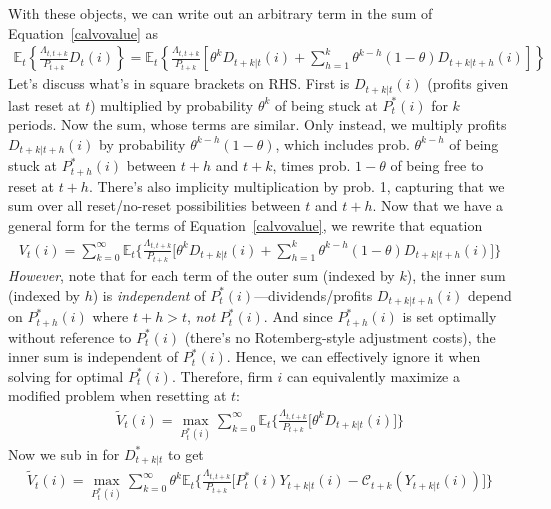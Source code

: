 \documentclass[12pt]{article}
\theoremstyle{plain}
\theoremstyle{definition}
\theoremstyle{remark}
\newcommand{\calC}{\mathcal{C}}
\newcommand{\E}{\mathbb{E}}
\begin{document}
With these objects, we can write out an arbitrary term in the sum of
Equation~\ref{calvovalue} as
\begin{align*}
  \E_t\left\{
  \frac{\Lambda_{t,t+k}}{P_{t+k}}
  D_t(i)
  \right\}
  =
  \E_t\left\{
  \frac{\Lambda_{t,t+k}}{P_{t+k}}
  \left[
  \theta^kD_{t+k|t}(i)
  +
  \sum_{h=1}^k
  \theta^{k-h}(1-\theta)D_{t+k|t+h}(i)
  \right]
  \right\}
\end{align*}
Let's discuss what's in square brackets on RHS. First
is $D_{t+k|t}(i)$ (profits given last reset at $t$) multiplied
by probability $\theta^k$ of being stuck at $P_t^*(i)$ for $k$
periods. Now the sum, whose terms are similar.
Only instead, we multiply profits $D_{t+k|t+h}(i)$ by probability
$\theta^{k-h}(1-\theta)$, which includes prob.
$\theta^{k-h}$ of being stuck at $P_{t+h}^*(i)$ between $t+h$ and
$t+k$, times prob. $1-\theta$ of being free to reset at
$t+h$.  There's also implicity multiplication by prob. 1,
capturing that we sum over all reset/no-reset
possibilities between $t$ and $t+h$.
\clearpage
Now that we have a general form for the terms of
Equation~\ref{calvovalue}, we rewrite that equation \begin{align}
  V_t(i)
  =
  \sum_{k=0}^\infty
  \E_t\bigg\{
  \frac{\Lambda_{t,t+k}}{P_{t+k}}
  \bigg[
  \theta^kD_{t+k|t}(i)
  +
  \sum_{h=1}^k
  \theta^{k-h}(1-\theta)D_{t+k|t+h}(i)
  \bigg]
  \bigg\}
  \label{calvovalue2}
\end{align}
\emph{However}, note that for each term of the outer sum (indexed by
$k$), the inner sum (indexed by $h$) is \emph{independent} of
$P_t^*(i)$---dividends/profits $D_{t+k|t+h}(i)$ depend on
$P_{t+h}^*(i)$ where $t+h>t$, \emph{not}
$P_t^*(i)$. And since $P_{t+h}^*(i)$ is set optimally without
reference to $P_t^*(i)$ (there's no Rotemberg-style adjustment
costs), the inner sum is independent of $P_t^*(i)$.  Hence, we can
effectively ignore it when solving for optimal $P_t^*(i)$.
Therefore, firm $i$ can equivalently maximize a modified problem
when resetting at $t$:
\begin{align}
  \tilde{V}_t(i)
  = \max_{P_t^*(i)}
  \sum_{k=0}^\infty
  \E_t\bigg\{
  \frac{\Lambda_{t,t+k}}{P_{t+k}}
  \bigg[
  \theta^kD_{t+k|t}(i)
  \bigg]
  \bigg\}
  \label{calvovalue3}
\end{align}
Now we sub in for $D_{t+k|t}^*$ to get
\begin{align}
  \tilde{V}_t(i)
  = \max_{P_t^*(i)}
  \sum_{k=0}^\infty
  \theta^k
  \E_t\bigg\{
  \frac{\Lambda_{t,t+k}}{P_{t+k}}
  \bigg[
  P_t^*(i)Y_{t+k|t}(i)
  - \calC_{t+k}(Y_{t+k|t}(i))
  \bigg]
  \bigg\}
  \label{calvovalue4}
\end{align}
\end{document}
